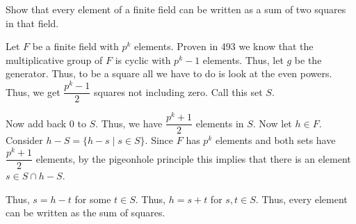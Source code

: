 \documentclass[12pt, letterpaper]{article}
\begin{document}
\begin{problem}{}
    Show that every element of a finite field can be written as a sum of two squares in that field. 
\end{problem}
\begin{problemproof}
    Let $F$ be a finite field with $p^k$ elements. Proven in 493 we know that the multiplicative group of $F$ is cyclic with $p^k-1$ elements. Thus, let $g$ be the generator. Thus, to be a square all we have to do is look at the even powers. Thus, we get $\dfrac{p^k-1}{2}$ squares not including zero. Call this set $S$.

    Now add back $0$ to $S$. Thus, we have $\dfrac{p^k+1}{2}$ elements in $S$. Now let $h \in F$. Consider $h-S=\{h-s \mid s \in S\}$. Since $F$ has $p^k$ elements and both sets have $\dfrac{p^k+1}{2}$ elements, by the pigeonhole principle this implies that there is an element $s \in S \cap h-S$.

    Thus, $s=h-t$ for some $t \in S$. Thus, $h=s+t$ for $s,t \in S$. Thus, every element can be written as the sum of squares.
\end{problemproof}
\end{document}
